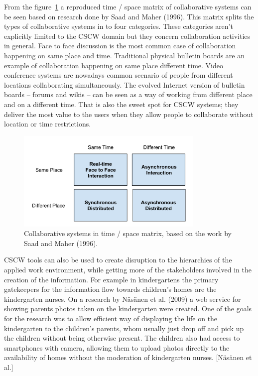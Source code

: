 From the figure~\ref{fig:cscw-matrix} a reproduced time / space matrix of collaborative systems can be seen based on research done by Saad and Maher (1996). This matrix splits the types of collaborative systems in to four categories. These categories aren't explicitly limited to the CSCW domain but they concern collaboration activities in general. Face to face discussion is the most common case of collaboration happening on same place and time. Traditional physical bulletin boards are an example of collaboration happening on same place different time. Video conference systems are nowadays common scenario of people from different locations collaborating simultaneously. The evolved Internet version of bulletin boards – forums and wikis – can be seen as a way of working from different place and on a different time. That is also the sweet spot for CSCW systems; they deliver the most value to the users when they allow people to collaborate without location or time restrictions. %

\begin{figure}[t]
\begin{center}
\includegraphics[width=0.8\textwidth]{assets/cscw-matrix.png}
\end{center}
\caption{Collaborative systems in time / space matrix, based on the work by Saad and Maher (1996).}
\label{fig:cscw-matrix}
\end{figure}


CSCW tools can also be used to create disruption to the hierarchies of the applied work environment, while getting more of the stakeholders involved in the creation of the information. For example in kindergartens the primary gatekeepers for the information flow towards children's homes are the kindergarten nurses. On a research by Näsänen et al. (2009) a web service for showing parents photos taken on the kindergarten were created. One of the goals for the research was to allow efficient way of displaying the life on the kindergarten to the children's parents, whom usually just drop off and pick up the children without being otherwise present. The children also had access to smartphones with camera, allowing them to upload photos directly to the availability of homes without the moderation of kindergarten nurses. [Näsänen et al.] 

